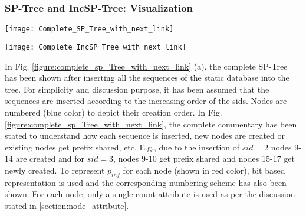%





%

\subsubsection{SP-Tree and IncSP-Tree: Visualization}


\begin{figure*}[!htb]
\centering
\texttt{[image: Complete\_SP\_Tree\_with\_next\_link]}
\caption{(a) Complete SP-Tree, (b) Next links for node 18 and 19} \label{figure:complete_sp_Tree_with_next_link}
\end{figure*}


\begin{figure*}[!htb]
\centering
\texttt{[image: Complete\_IncSP\_Tree\_with\_next\_link]}
\caption{(a) IncSP-Tree after iteration 1, (b)IncSP-Tree after iteration 2} \label{figure:complete_inc_sp_Tree_with_with_two_pass}
\end{figure*}

In Fig. \ref{figure:complete_sp_Tree_with_next_link} (a), the complete SP-Tree has been shown after inserting all the sequences of the static database into the tree. For simplicity and discussion purpose, it has been assumed that the sequences are inserted according to the increasing order of the sids. Nodes are numbered (blue color) to depict their creation order. In Fig. \ref{figure:complete_sp_Tree_with_next_link}, the complete commentary has been stated to understand how each sequence is inserted, new nodes are created or existing nodes get prefix shared, etc. E.g., due to the insertion of $sid=2$ nodes 9-14 are created and for $sid=3$, nodes 9-10 get prefix shared and nodes 15-17 get newly created. To represent $p_{inf}$ for each node (shown in red color), bit based representation is used and the corresponding numbering scheme has also been shown. For each node, only a single count attribute is used as per the discussion stated in \ref{section:node_attribute}.


